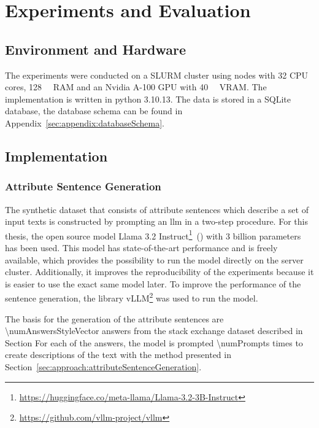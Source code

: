 \chapter{Experiments and Evaluation}
\label{sec:experiments_evaluation}


\section{Environment and Hardware}
\label{sec:experiments_evaluation:environmentHardware}
The experiments were conducted on a SLURM cluster using nodes with \num{32} CPU cores, \SI{128}{\giga\byte} RAM and an Nvidia A-100 GPU with \SI{40}{\giga\byte} VRAM. The implementation is written in python 3.10.13. The data is stored in a SQLite database, the database schema can be found in Appendix~\ref{sec:appendix:databaseSchema}.

\section{Implementation}
\label{sec:experiments_evaluation:implementation}

\subsection{Attribute Sentence Generation}
\label{sec:experiments_evaluation:implementation:sentenceGeneration}
The synthetic dataset that consists of attribute sentences which describe a set of input texts is constructed by prompting an \acs{llm} in a two-step procedure. For this thesis, the open source model Llama 3.2 Instruct\footnote{\url{https://huggingface.co/meta-llama/Llama-3.2-3B-Instruct}}~(\cite{dubeyLlama3Herd2024}) with \num{3} billion parameters has been used. This model has state-of-the-art performance and is freely available, which provides the possibility to run the model directly on the server cluster. Additionally, it improves the reproducibility of the experiments because it is easier to use the exact same model later.
To improve the performance of the sentence generation, the library vLLM\footnote{\url{https://github.com/vllm-project/vllm}} was used to run the model.

The basis for the generation of the attribute sentences are \num{\numAnswersStyleVector} answers from the stack exchange dataset described in Section %
For each of the answers, the model is prompted \num{\numPrompts} times to create descriptions of the text with the method presented in Section~\ref{sec:approach:attributeSentenceGeneration}.

